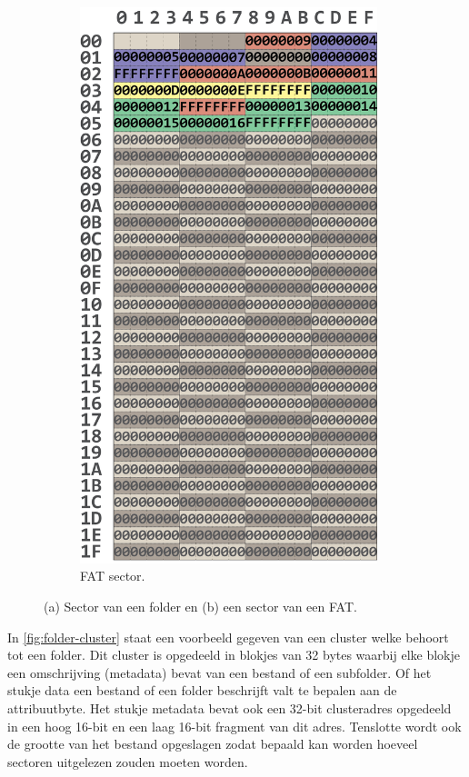\begin{figure}[h!]
\begin{subfigure}[t]{0.4\textwidth}
        \includegraphics[width=0.95\textwidth]{img/fat32-voorbeeld.png}
        \caption{FAT sector.}
        \label{fig:fat-example}
    \end{subfigure}
    \caption{(a) Sector van een folder en (b) een sector van een FAT.}
\end{figure}

In \cref{fig:folder-cluster} staat een voorbeeld gegeven van een cluster welke behoort tot een folder. Dit cluster is opgedeeld in blokjes van 32 bytes waarbij elke blokje een omschrijving (metadata) bevat van een bestand of een subfolder. Of het stukje data een bestand of een folder beschrijft valt te bepalen aan de attribuutbyte. Het stukje metadata bevat ook een 32-bit clusteradres opgedeeld in een hoog 16-bit en een laag 16-bit fragment van dit adres. Tenslotte wordt ook de grootte van het bestand opgeslagen zodat bepaald kan worden hoeveel sectoren uitgelezen zouden moeten worden. 

